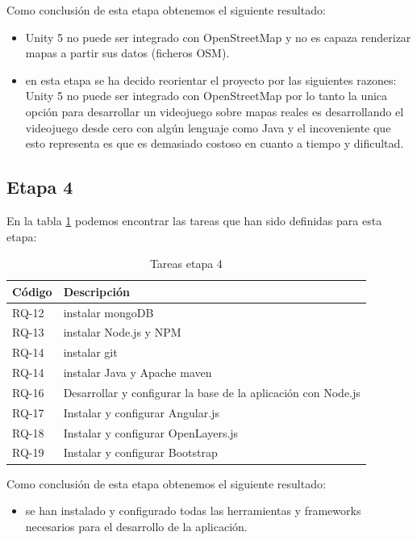 Como conclusión de esta etapa obtenemos el siguiente resultado:
\begin{itemize}
	\item Unity 5 no puede ser integrado con OpenStreetMap y no es capaza renderizar mapas a partir sus datos (ficheros OSM). 
	\item en esta etapa se ha decido reorientar el proyecto por las siguientes razones: Unity 5 no puede ser integrado con OpenStreetMap por lo tanto la unica opción para desarrollar un videojuego sobre mapas reales es desarrollando el videojuego desde cero con algún lenguaje como Java y el incoveniente que esto representa es que es demasiado costoso en cuanto a tiempo y dificultad.  
\end{itemize}

\subsection{Etapa 4}

En la tabla \ref{tabla:requisitosEtapa4} podemos encontrar las tareas que han sido definidas para esta etapa:

\begin{table}[H]
\begin{center}
\begin{tabular}{|p{1.5cm}| p{10.5cm}|}
\hline 
Código & Descripción \\
\hline \hline
RQ-12 & instalar mongoDB\\ \hline
RQ-13 & instalar Node.js y NPM\\ \hline
RQ-14 & instalar git\\ \hline
RQ-14 & instalar Java y Apache maven\\ \hline
RQ-16 & Desarrollar y configurar la base de la aplicación con Node.js\\ \hline
RQ-17 & Instalar y configurar Angular.js\\ \hline
RQ-18 & Instalar y configurar OpenLayers.js\\ \hline
RQ-19 & Instalar y configurar Bootstrap\\ \hline
\end{tabular}
\caption{Tareas etapa 4}
\label{tabla:requisitosEtapa4}
\end{center}
\end{table}

\newpage

Como conclusión de esta etapa obtenemos el siguiente resultado:
\begin{itemize}
	\item se han instalado y configurado todas las herramientas y frameworks necesarios para el desarrollo de la aplicación.
\end{itemize}

